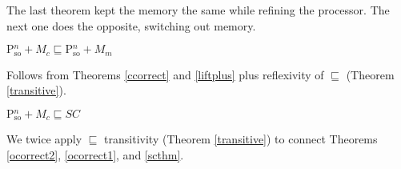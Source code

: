 The last theorem kept the memory the same while refining the
processor.  The next one does the opposite, switching out memory.

\begin{theorem}
\label{ocorrect2}
$\text{P$^n_\text{so}$} + M_c \sqsubseteq \text{P$^n_\text{so}$} + M_m$
\end{theorem}
\begin{prf}
Follows from Theorems \ref{ccorrect} and \ref{liftplus} plus reflexivity of $\sqsubseteq$ (Theorem \ref{transitive}).
\end{prf}

\begin{theorem}
\label{ofull}
$\text{P$^n_\text{so}$} + M_c \sqsubseteq SC$
\end{theorem}
\begin{prf}
We twice apply $\sqsubseteq$ transitivity (Theorem \ref{transitive}) to
connect Theorems \ref{ocorrect2}, \ref{ocorrect1}, and \ref{scthm}.
\end{prf}
